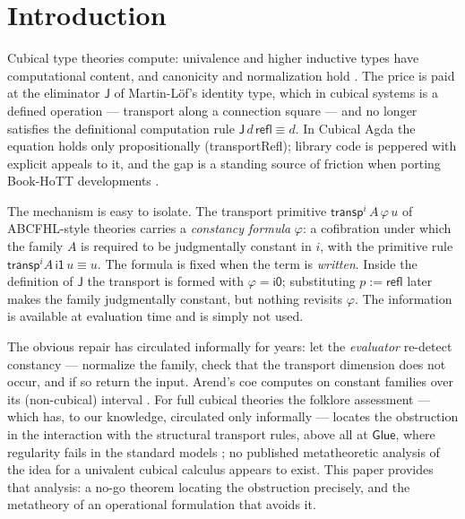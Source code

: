 \documentclass{lmcs}
\newcommand{\transp}{\mathsf{transp}}
\newcommand{\refl}{\mathsf{refl}}
\newcommand{\J}{\mathsf{J}}
\newcommand{\Glue}{\mathsf{Glue}}
\renewcommand{\conv}{\equiv}
\newcommand{\ii}{\mathsf{i1}}
\newcommand{\io}{\mathsf{i0}}
\begin{document}
\maketitle

\section{Introduction}
\label{sec:intro}

Cubical type theories \cite{CCHM,ABCFHL} compute: univalence and
higher inductive types have computational content, and canonicity and
normalization hold \cite{HuberNorm,SterlingAngiuli}.  The price is
paid at the eliminator $\J$ of Martin-L\"of's identity type, which in
cubical systems is a defined operation --- transport along a
connection square --- and no longer satisfies the definitional
computation rule $\J\,d\,\refl \conv d$.  In Cubical Agda
\cite{VezzosiMortbergAbel} the equation holds only propositionally
(\textsf{transportRefl}); library code is peppered with explicit
appeals to it, and the gap is a standing source of friction when
porting Book-HoTT developments \cite{UIPCubical}.

The mechanism is easy to isolate.  The transport primitive
$\transp^i\,A\,\varphi\,u$ of ABCFHL-style theories carries a
\emph{constancy formula} $\varphi$: a cofibration under which the
family $A$ is required to be judgmentally constant in $i$, with the
primitive rule $\transp^i A\,\ii\,u \conv u$.  The formula is fixed
when the term is \emph{written}.  Inside the definition of $\J$ the
transport is formed with $\varphi = \io$; substituting $p := \refl$
later makes the family judgmentally constant, but nothing revisits
$\varphi$.  The information is available at evaluation time and is
simply not used.

The obvious repair has circulated informally for years: let the
\emph{evaluator} re-detect constancy --- normalize the family, check
that the transport dimension does not occur, and if so return the
input.  Arend's \textsf{coe} computes on constant families over its
(non-cubical) interval \cite{Arend}.  For full cubical theories the
folklore assessment --- which has, to our knowledge, circulated only
informally --- locates the obstruction in the interaction with the
structural transport rules, above all at $\Glue$, where regularity
fails in the standard models \cite{SwanRegularity,SattlerNote}; no
published metatheoretic analysis of the idea for a univalent cubical
calculus appears to exist.
This paper provides that analysis: a no-go theorem locating the
obstruction precisely, and the metatheory of an operational
formulation that avoids it.
\end{document}
